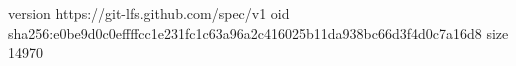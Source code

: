 version https://git-lfs.github.com/spec/v1
oid sha256:e0be9d0c0effffcc1e231fc1c63a96a2c416025b11da938bc66d3f4d0c7a16d8
size 14970
